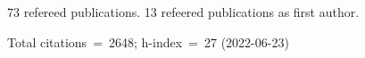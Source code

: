 73 refereed publications. 13 refeered publications as first author.

Total citations~=~2648; h-index~=~27 (2022-06-23)